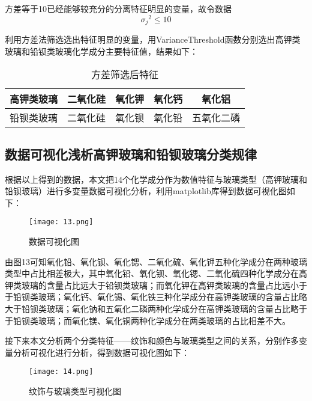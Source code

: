 方差等于10已经能够较充分的分离特征明显的变量，故令数据
\begin{equation}
    {\sigma_j}^2 \leq 10
\end{equation}

利用方差法筛选选出特征明显的变量，用VarianceThreshold函数分别选出高钾类玻璃和铅钡类玻璃化学成分主要特征值，结果如下：

\begin{table}[H]
	\centering
	\begin{tabular}{c c c c c} 
		\toprule[1.5pt]
		高钾类玻璃 & 二氧化硅 & 氧化钾 & 氧化钙 & 氧化铝 \\
		\midrule[1pt]
		铅钡类玻璃 & 二氧化硅 & 氧化钡 & 氧化铅 & 五氧化二磷 \\
		\toprule[1.5pt]
	\end{tabular}
\caption{方差筛选后特征}
\end{table}


\subsection{数据可视化浅析高钾玻璃和铅钡玻璃分类规律}

根据以上得到的数据，本文把14个化学成分作为数值特征与玻璃类型（高钾玻璃和铅钡玻璃）进行多变量数据可视化分析，利用matplotlib库得到数据可视化图如下：

\begin{figure}[H] 
	\centering %
	\texttt{[image: 13.png]} %
	\caption{数据可视化图} %
	\label{Fig.main14} %
\end{figure}

由图13可知氧化铅、氧化钡、氧化锶、二氧化硫、氧化钾五种化学成分在两种玻璃类型中占比相差极大，其中氧化铅、氧化钡、氧化锶、二氧化硫四种化学成分在高钾类玻璃的含量占比远大于铅钡类玻璃；而氧化钾在高钾类玻璃的含量占比远小于于铅钡类玻璃；氧化钙、氧化锡、氧化铁三种化学成分在高钾类玻璃的含量占比略大于铅钡类玻璃；氧化钠和五氧化二磷两种化学成分在高钾类玻璃的含量占比略于于铅钡类玻璃；而氧化镁、氧化铜两种化学成分在两类玻璃的占比相差不大。

接下来本文分析两个分类特征——纹饰和颜色与玻璃类型之间的关系，分别作多变量分析可视化进行分析，得到数据可视化图如下：

\begin{figure}[H] 
	\centering %
	\texttt{[image: 14.png]} %
	\caption{纹饰与玻璃类型可视化图} %
	\label{Fig.main15} %
\end{figure}

